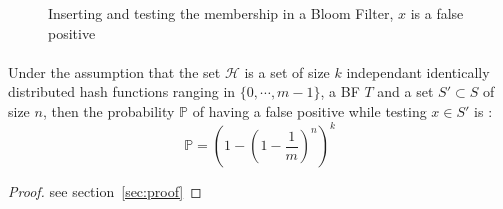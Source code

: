 \begin{figure}[H]
\caption{Inserting and testing the membership in a Bloom Filter, $x$ is a false positive} \label{fig:fp}
\end{figure}
\paragraph{}
\begin{proposition}
 Under the assumption that the set $\mathcal H$ is a set of size $k$ independant identically distributed hash functions ranging in $\{0,\cdots,m-1\}$, a BF $T$ and a set $S'\subset S$  of size $n$, then the probability $\mathbb{P}$ of having a false positive while testing $x \in S'$ is :
 \[
  \mathbb{P}=\left ( 1 - \left ( 1 - \frac{1}{m} \right )^n \right )^k
 \]
\end{proposition}
\begin{proof}
see section~\ref{sec:proof}
\end{proof}
